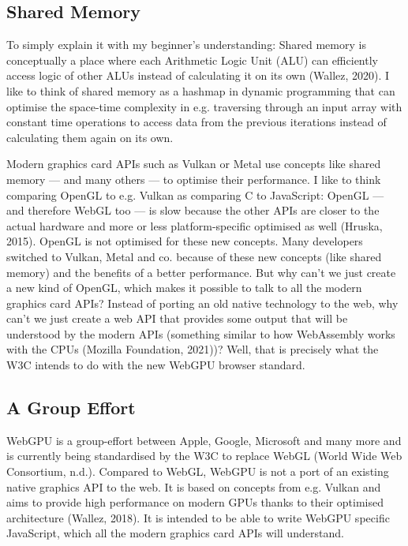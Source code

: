 \documentclass[10pt]{article}
\begin{document}
\begin{sloppypar}
  \subsection{Shared Memory}
  \label{subsec:shared-memory}

  To simply explain it with my beginner’s understanding: Shared memory is conceptually a place where each Arithmetic Logic Unit (ALU) can efficiently access logic of other ALUs instead of calculating it on its own (Wallez, 2020). I like to think of shared memory as a hashmap in dynamic programming that can optimise the space-time complexity in e.g. traversing through an input array with constant time operations to access data from the previous iterations instead of calculating them again on its own.

  Modern graphics card APIs such as Vulkan or Metal use concepts like shared memory — and many others — to optimise their performance. I like to think comparing OpenGL to e.g. Vulkan as comparing C to JavaScript: OpenGL — and therefore WebGL too — is slow because the other APIs are closer to the actual hardware and more or less platform-specific optimised as well (Hruska, 2015). OpenGL is not optimised for these new concepts. Many developers switched to Vulkan, Metal and co. because of these new concepts (like shared memory) and the benefits of a better performance. But why can’t we just create a new kind of OpenGL, which makes it possible to talk to all the modern graphics card APIs? Instead of porting an old native technology to the web, why can’t we just create a web API that provides some output that will be understood by the modern APIs (something similar to how WebAssembly works with the CPUs (Mozilla Foundation, 2021))? Well, that is precisely what the W3C intends to do with the new WebGPU browser standard.

  \subsection{A Group Effort}
  \label{subsec:a-group-effort}

  WebGPU is a group-effort between Apple, Google, Microsoft and many more and is currently being standardised by the W3C to replace WebGL (World Wide Web Consortium, n.d.). Compared to WebGL, WebGPU is not a port of an existing native graphics API to the web. It is based on concepts from e.g. Vulkan and aims to provide high performance on modern GPUs thanks to their optimised architecture (Wallez, 2018). It is intended to be able to write WebGPU specific JavaScript, which all the modern graphics card APIs will understand.


\end{sloppypar}
\end{document}
